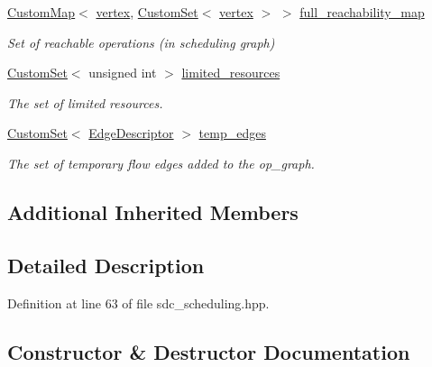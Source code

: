 \begin{DoxyCompactItemize}
\hyperlink{custom__map_8hpp_a18ca01763abbe3e5623223bfe5aaac6b}{Custom\+Map}$<$ \hyperlink{graph_8hpp_abefdcf0544e601805af44eca032cca14}{vertex}, \hyperlink{custom__set_8hpp_a615bc2f42fc38a4bb1790d12c759e86f}{Custom\+Set}$<$ \hyperlink{graph_8hpp_abefdcf0544e601805af44eca032cca14}{vertex} $>$ $>$ \hyperlink{classSDCScheduling_a5deb967dd6434ccdca93c2a8ecfb6c96}{full\+\_\+reachability\+\_\+map}
\begin{DoxyCompactList}\small\item\em Set of reachable operations (in scheduling graph) \end{DoxyCompactList}\item 
\hyperlink{custom__set_8hpp_a615bc2f42fc38a4bb1790d12c759e86f}{Custom\+Set}$<$ unsigned int $>$ \hyperlink{classSDCScheduling_a2ed924e6855e557c34362b40c7e92485}{limited\+\_\+resources}
\begin{DoxyCompactList}\small\item\em The set of limited resources. \end{DoxyCompactList}\item 
\hyperlink{custom__set_8hpp_a615bc2f42fc38a4bb1790d12c759e86f}{Custom\+Set}$<$ \hyperlink{graph_8hpp_a9eb9afea34e09f484b21f2efd263dd48}{Edge\+Descriptor} $>$ \hyperlink{classSDCScheduling_a9f2850cc4d2504a67b0f252e39f0f629}{temp\+\_\+edges}
\begin{DoxyCompactList}\small\item\em The set of temporary flow edges added to the op\+\_\+graph. \end{DoxyCompactList}\end{DoxyCompactItemize}
\subsection*{Additional Inherited Members}


\subsection{Detailed Description}


Definition at line 63 of file sdc\+\_\+scheduling.\+hpp.



\subsection{Constructor \& Destructor Documentation}
\mbox{\label{classSDCScheduling_a892cbceb7ab8685568dd700c3cd00a2a}} 
